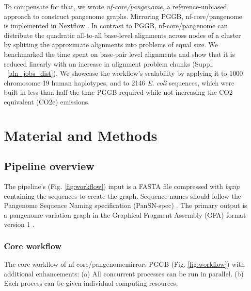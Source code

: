 \documentclass{bioinfo}
\theoremstyle{definition}
\begin{document}
	To compensate for that, we wrote \textit{nf-core/pangenome}, a reference-unbiased approach to construct pangenome graphs. 
	Mirroring PGGB, nf-core/pangenome is implemented in Nextflow \citep{DiTommaso2017}.
	In contrast to PGGB, nf-core/pangenome can distribute the quadratic all-to-all base-level alignments across nodes of a cluster by splitting the approximate alignments into problems of equal size. 
	We benchmarked the time spent on base-pair level alignments and show that it is reduced linearly with an increase in alignment problem chunks (Suppl. ~\ref{aln_jobs_dist}). 
	We showcase the workflow’s scalability by applying it to 1000 chromosome 19 human haplotypes, and to 2146 \textit{E. coli} sequences, which were built in less than half the time PGGB required while not increasing the CO2 equivalent (CO2e) emissions.
	\vspace{-0.6cm}
	\section{Material and Methods}
	
	\subsection{Pipeline overview}
	The pipeline’s (Fig. \ref{fig:workflow}) input is a FASTA file compressed with \textit{bgzip} \citep{Li2009} containing the sequences to create the graph. 
	Sequence names should follow the Pangenome Sequence Naming specification (PanSN-spec) \citep{pansn-spec}. 
	The primary output is a pangenome variation graph \citep{Garrison:2018} in the Graphical Fragment Assembly (GFA) format version 1 \citep{GFA}.
	
	

	\subsubsection{Core workflow}
	
	The core workflow of nf-core/pangenomemirrors PGGB (Fig. \ref{fig:workflow}) with additional enhancements: (a) All concurrent processes can be run in parallel. (b) Each process can be given individual computing resources.
	
\end{document}
